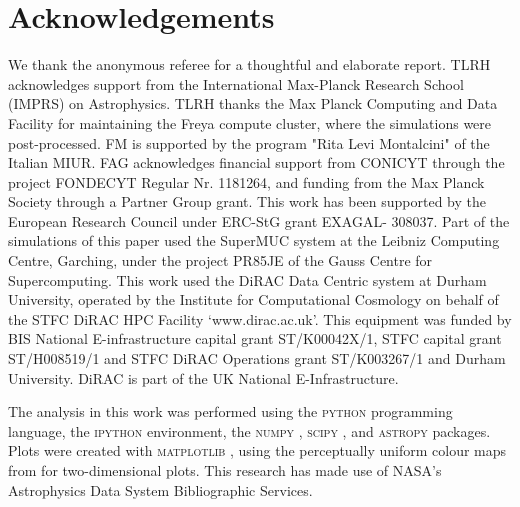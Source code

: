 \documentclass[a4paper,fleqn,usenatbib]{mnras}
\begin{document}
\section*{Acknowledgements}
We thank the anonymous referee for a thoughtful and elaborate report.
TLRH acknowledges support from the International Max-Planck Research School (IMPRS)
on Astrophysics. TLRH thanks the Max Planck Computing and Data Facility for
maintaining the Freya compute cluster, where the simulations were post-processed.
FM is supported by the program "Rita Levi Montalcini" of the Italian MIUR. FAG 
acknowledges financial support from CONICYT through the project FONDECYT Regular 
Nr. 1181264, and funding from the Max Planck Society through a Partner Group grant.
This work has been supported by the European Research Council under ERC-StG grant
EXAGAL- 308037. Part of the simulations of this paper used the SuperMUC system 
at the Leibniz Computing Centre, Garching, under the project PR85JE of the Gauss 
Centre for Supercomputing. This work used the DiRAC Data Centric system at Durham
University, operated by the Institute for Computational Cosmology on behalf of
the STFC DiRAC HPC Facility `www.dirac.ac.uk'. This equipment was funded by BIS 
National E-infrastructure capital grant ST/K00042X/1, STFC capital grant 
ST/H008519/1 and STFC DiRAC Operations grant ST/K003267/1 and Durham University.
DiRAC is part of the UK National E-Infrastructure.

The analysis in this work was performed using the \textsc{python} \citep{python}
programming language, the \textsc{ipython} \citep{2007CSE.....9c..21P} environment, 
the \textsc{numpy} \citep{2011CSE....13b..22V}, \textsc{scipy} \citep{2020SciPy-NMeth}, and \textsc{astropy}
\citep{2013A&A...558A..33A} packages. Plots were created with \textsc{matplotlib}
\citep{2007CSE.....9...90H}, using the perceptually uniform colour maps
from \citet{2015arXiv150903700K} for two-dimensional plots. This research 
has made use of NASA's Astrophysics Data System Bibliographic Services.







 






\bsp    %
\label{lastpage}
\end{document}
